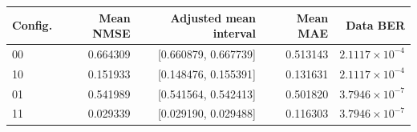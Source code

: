 \begin{tabular}{lrrrr}
\toprule
Config. & Mean NMSE & Adjusted mean interval & Mean MAE & Data BER \\
\midrule
00 & 0.664309 & [0.660879, 0.667739] & 0.513143 & $2.1117\times10^{-4}$ \\
10 & 0.151933 & [0.148476, 0.155391] & 0.131631 & $2.1117\times10^{-4}$ \\
01 & 0.541989 & [0.541564, 0.542413] & 0.501820 & $3.7946\times10^{-7}$ \\
11 & 0.029339 & [0.029190, 0.029488] & 0.116303 & $3.7946\times10^{-7}$ \\
\bottomrule
\end{tabular}
